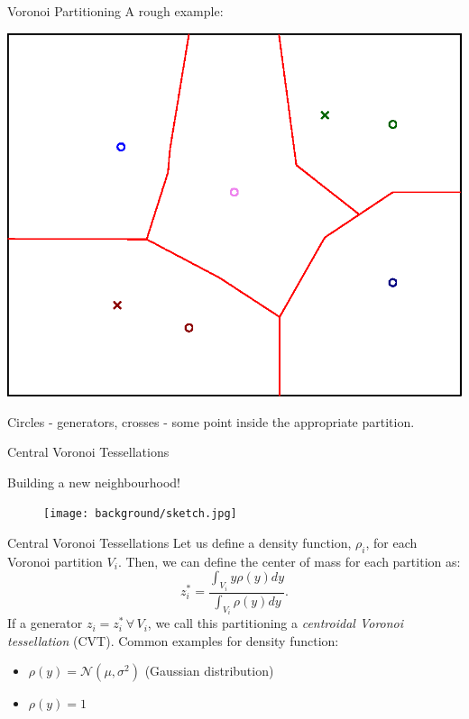 \documentclass[t]{beamer}
\begin{document}
\begin{frame}[label=vorpart3]{Voronoi Partitioning}
A rough example:
\begin{center}
\includegraphics[scale=0.6]{background/Voronoi-example.eps}
\end{center}
Circles - generators, crosses - some point inside the appropriate partition.
\end{frame}
\begin{frame}[label=centvorpart1]{Central Voronoi Tessellations}
\begin{center}
Building a new neighbourhood!
\begin{figure}
\centering
\texttt{[image: background/sketch.jpg]}
\end{figure}
\end{center}
\end{frame}
\begin{frame}[label=centvorpart2]{Central Voronoi Tessellations}
Let us define a density function, $\rho_i$, for each Voronoi partition $V_{i}$. Then, we can define the center of mass for each partition as:
\begin{equation*}
z_{i}^{*} = \frac{\int_{V_{i}}y\rho(y)dy}{\int_{V_{i}}\rho(y)dy}.
\end{equation*}
If a generator $z_{i} = z_{i}^{*} \, \forall \,V_{i}$, we call this partitioning a \emph{centroidal Voronoi tessellation} (CVT).
Common examples for density function:
\begin{itemize}
\item $\rho(y) = \mathcal{N}\left( \mu, \sigma ^2 \right)$ (Gaussian distribution)
\item $\rho(y) = 1$
\end{itemize}
\end{frame}
\end{document}
